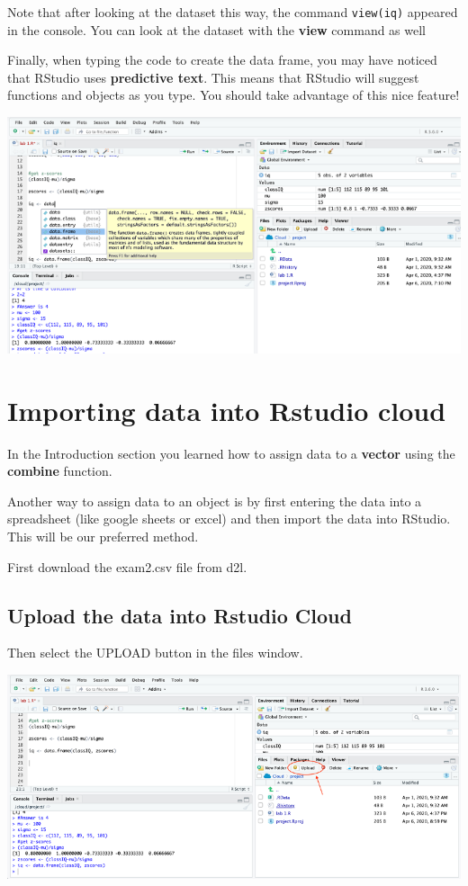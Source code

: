 \documentclass[
]{book}
\begin{document}
Note that after looking at the dataset this way, the command \texttt{view(iq)} appeared in the console. You can look at the dataset with the \textbf{view} command as well

Finally, when typing the code to create the data frame, you may have noticed that RStudio uses \textbf{predictive text}. This means that RStudio will suggest functions and objects as you type. You should take advantage of this nice feature!

\includegraphics{img/autofill.png}

\hypertarget{importing-data-into-rstudio-cloud}{%
\section{Importing data into Rstudio cloud}\label{importing-data-into-rstudio-cloud}}

In the Introduction section you learned how to assign data to a \textbf{vector} using the \textbf{combine} function.

Another way to assign data to an object is by first entering the data into a spreadsheet (like google sheets or excel) and then import the data into RStudio. This will be our preferred method.

First download the exam2.csv file from d2l.

\hypertarget{upload-the-data-into-rstudio-cloud}{%
\subsection{Upload the data into Rstudio Cloud}\label{upload-the-data-into-rstudio-cloud}}

Then select the UPLOAD button in the files window.

\includegraphics{img/upload.png}
\end{document}

